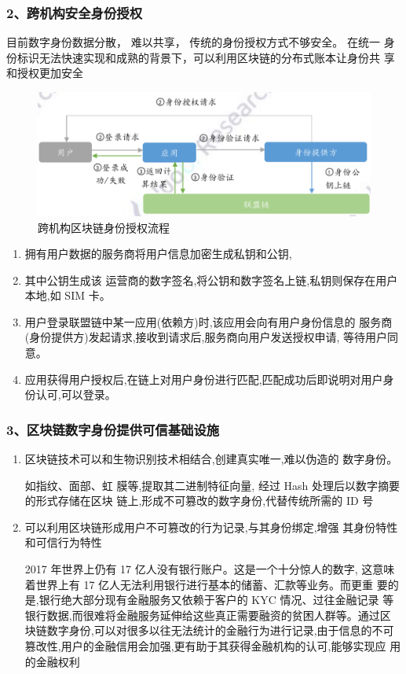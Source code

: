 \documentclass[11pt]{beamer}
\begin{document}
\begin{frame}
	\frametitle{2、跨机构安全身份授权}
	{\scriptsize 目前数字身份数据分散， 难以共享， 传统的身份授权方式不够安全。 在统一
		身份标识无法快速实现和成熟的背景下，可以利用区块链的分布式账本让身份共
		享和授权更加安全}
	\begin{minipage}[t]{0.5\linewidth}
	\begin{figure}
	\centering
	\includegraphics[width=\linewidth]{figures/eid/1}
	\caption{跨机构区块链身份授权流程}
\end{figure}
\end{minipage}%
\begin{minipage}[t]{0.5\linewidth}
{\scriptsize 	\begin{enumerate}
		\item 拥有用户数据的服务商将用户信息加密生成私钥和公钥,
		\item 
		其中公钥生成该
		运营商的数字签名,将公钥和数字签名上链,私钥则保存在用户本地,如 SIM 卡。
		\item  用户登录联盟链中某一应用(依赖方)时,该应用会向有用户身份信息的
		服务商(身份提供方)发起请求,接收到请求后,服务商向用户发送授权申请,
		等待用户同意。
		\item  应用获得用户授权后,在链上对用户身份进行匹配,匹配成功后即说明对用户身份认可,可以登录。
\end{enumerate}}
\end{minipage}%
\end{frame}

\begin{frame}[allowframebreaks]
	\frametitle{3、区块链数字身份提供可信基础设施}
\begin{enumerate}
	\item 区块链技术可以和生物识别技术相结合,创建真实唯一,难以伪造的
	数字身份。
	\begin{example}
		如指纹、面部、虹
		膜等,提取其二进制特征向量, 经过 Hash 处理后以数字摘要的形式存储在区块
		链上,形成不可篡改的数字身份,代替传统所需的 ID 号
	\end{example}
	\item 可以利用区块链形成用户不可篡改的行为记录,与其身份绑定,增强
	其身份特性和可信行为特性
	
	{\tiny 2017 年世界上仍有 17 亿人没有银行账户。这是一个十分惊人的数字,
	这意味着世界上有 17 亿人无法利用银行进行基本的储蓄、汇款等业务。而更重
	要的是,银行绝大部分现有金融服务又依赖于客户的 KYC 情况、过往金融记录
	等银行数据,而很难将金融服务延伸给这些真正需要融资的贫困人群等。通过区
	块链数字身份,可以对很多以往无法统计的金融行为进行记录,由于信息的不可
	篡改性,用户的金融信用会加强,更有助于其获得金融机构的认可,能够实现应
	用的金融权利}
\end{enumerate}
\end{frame}
\end{document}
